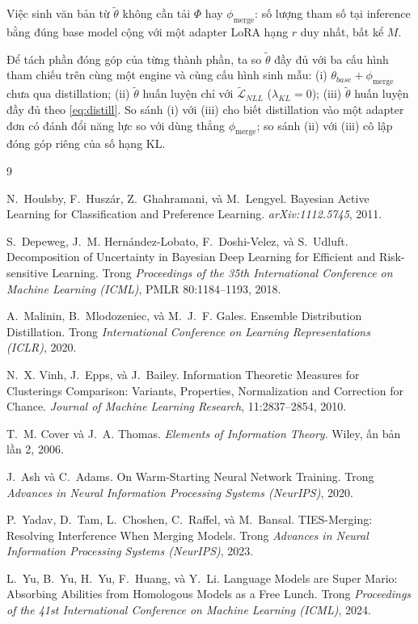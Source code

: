 \documentclass[12pt,a4paper]{article}
\newcommand{\pmerge}{\phi_{\mathrm{merge}}}
\begin{document}
Việc sinh văn bản từ $\tilde\theta$ không cần tải $\Phi$ hay $\pmerge$: số lượng tham số tại inference bằng đúng base model cộng với một adapter LoRA hạng $r$ duy nhất, bất kể $M$.

Để tách phần đóng góp của từng thành phần, ta so $\tilde\theta$ đầy đủ với ba cấu hình tham chiếu trên cùng một engine và cùng cấu hình sinh mẫu: (i) $\theta_{base}+\pmerge$ chưa qua distillation; (ii) $\tilde\theta$ huấn luyện chỉ với $\widetilde{\mathcal{L}}_{NLL}$ ($\lambda_{KL} = 0$); (iii) $\tilde\theta$ huấn luyện đầy đủ theo \eqref{eq:distill}. So sánh (i) với (iii) cho biết distillation vào một adapter đơn có đánh đổi năng lực so với dùng thẳng $\pmerge$; so sánh (ii) với (iii) cô lập đóng góp riêng của số hạng KL.

\begin{thebibliography}{9}

N.~Houlsby, F.~Huszár, Z.~Ghahramani, và M.~Lengyel.
\newblock Bayesian Active Learning for Classification and Preference Learning.
\newblock \emph{arXiv:1112.5745}, 2011.

S.~Depeweg, J.~M. Hernández-Lobato, F.~Doshi-Velez, và S.~Udluft.
\newblock Decomposition of Uncertainty in Bayesian Deep Learning for Efficient and Risk-sensitive Learning.
\newblock Trong \emph{Proceedings of the 35th International Conference on Machine Learning (ICML)}, PMLR 80:1184--1193, 2018.

A.~Malinin, B.~Mlodozeniec, và M.~J.~F. Gales.
\newblock Ensemble Distribution Distillation.
\newblock Trong \emph{International Conference on Learning Representations (ICLR)}, 2020.

N.~X. Vinh, J.~Epps, và J.~Bailey.
\newblock Information Theoretic Measures for Clusterings Comparison: Variants, Properties, Normalization and Correction for Chance.
\newblock \emph{Journal of Machine Learning Research}, 11:2837--2854, 2010.

T.~M. Cover và J.~A. Thomas.
\newblock \emph{Elements of Information Theory}.
\newblock Wiley, ấn bản lần 2, 2006.

J.~Ash và C.~Adams.
\newblock On Warm-Starting Neural Network Training.
\newblock Trong \emph{Advances in Neural Information Processing Systems (NeurIPS)}, 2020.

P.~Yadav, D.~Tam, L.~Choshen, C.~Raffel, và M.~Bansal.
\newblock TIES-Merging: Resolving Interference When Merging Models.
\newblock Trong \emph{Advances in Neural Information Processing Systems (NeurIPS)}, 2023.

L.~Yu, B.~Yu, H.~Yu, F.~Huang, và Y.~Li.
\newblock Language Models are Super Mario: Absorbing Abilities from Homologous Models as a Free Lunch.
\newblock Trong \emph{Proceedings of the 41st International Conference on Machine Learning (ICML)}, 2024.

\end{thebibliography}
\end{document}
